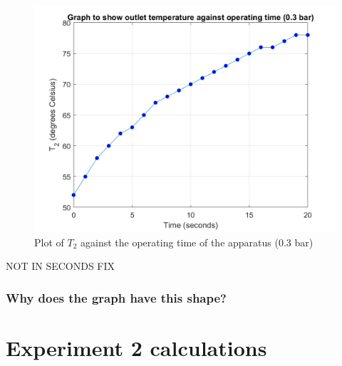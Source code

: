 \documentclass[class=article, crop=false, 12pt,a4paper]{standalone}
\begin{document}
\begin{figure}
  \includegraphics[width = 0.9 \textwidth]{./img/T203vsTimeGraph}
  \caption{Plot of \(T_2\) against the operating time of the apparatus (0.3 bar)}
  \label{ref:T203vsTime1bar}
\end{figure}
NOT IN SECONDS FIX
\subsubsection{Why does the graph have this shape?}

\section{Experiment 2 calculations}
\end{document}

